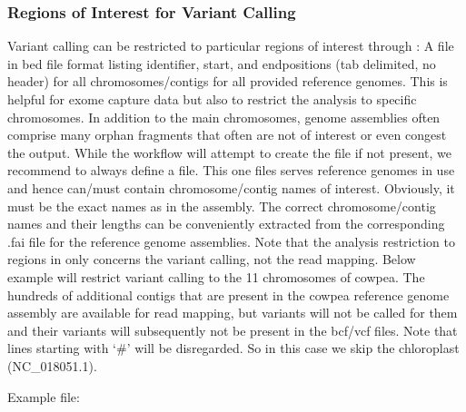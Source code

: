 \documentclass[letterpaper,10pt,english]{sphinxhowto}
\begin{document}
\subsubsection{Regions of Interest for Variant Calling}
\label{\detokenize{index:regions-of-interest-for-variant-calling}}
Variant calling can be restricted to particular regions of interest through : A file in bed file format listing identifier, start\sphinxhyphen{}, and end\sphinxhyphen{}positions (tab delimited, no header) for all chromosomes/contigs for all provided reference genomes. This is helpful for exome capture data but also to restrict the analysis to specific chromosomes. In addition to the main chromosomes, genome assemblies often comprise many orphan fragments that often are not of interest or even congest the output. While the workflow will attempt to create the file if not present, we recommend to always define a  file. This one files serves  reference genomes in use and hence can/must contain  chromosome/contig names of interest. Obviously, it must be the exact names as in the assembly. The correct chromosome/contig names and their lengths can be conveniently extracted from the corresponding .fai file for the reference genome assemblies. Note that the analysis restriction to regions in  only concerns the variant calling, not the read mapping.
Below example will restrict variant calling to the 11 chromosomes of cowpea. The hundreds of additional contigs that are present in the cowpea reference genome assembly are available for read mapping, but variants will not be called for them and their variants will subsequently not be present in the bcf/vcf files. Note that lines starting with ‘\#’ will be disregarded. So in this case we skip the chloroplast (NC\_018051.1).

Example  file:
\end{document}
